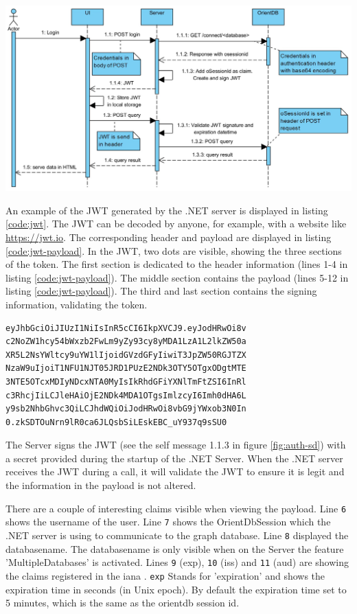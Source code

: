 \begingroup
\captionsetup{type=figure}
\includegraphics[scale=0.4]{images/authentication-sd.png}
\label{fig:auth-sd}
\endgroup

An example of the JWT generated by the .NET server is displayed in listing \ref{code:jwt}. The JWT can be decoded by anyone, for example, with a website like \url{https://jwt.io}. The corresponding header and payload are displayed in listing \ref{code:jwt-payload}. In the JWT, two dots are visible, showing the three sections of the token. The first section is dedicated to the header information (lines 1-4 in listing \ref{code:jwt-payload}). The middle section contains the payload (lines 5-12 in listing \ref{code:jwt-payload}). The third and last section contains the signing information, validating the token. 

\begin{lstlisting}[language=xml, caption=Example JSON Web Token (line breaks for display purposes only), style=nonrstyle, label=code:jwt]
eyJhbGciOiJIUzI1NiIsInR5cCI6IkpXVCJ9.eyJodHRwOi8v
c2NoZW1hcy54bWxzb2FwLm9yZy93cy8yMDA1LzA1L2lkZW50a
XR5L2NsYWltcy9uYW1lIjoidGVzdGFyIiwiT3JpZW50RGJTZX
NzaW9uIjoiT1NFU1NJT05JRD1PUzE2NDk3OTY5OTgxODgtMTE
3NTE5OTcxMDIyNDcxNTA0MyIsIkRhdGFiYXNlTmFtZSI6InRl
c3RhcjIiLCJleHAiOjE2NDk4MDA1OTgsImlzcyI6Imh0dHA6L
y9sb2NhbGhvc3QiLCJhdWQiOiJodHRwOi8vbG9jYWxob3N0In
0.zkSDTOuNrn9lR0ca6JLQsbSiLEskEBC_uY937q9sSU0
\end{lstlisting}

The Server signs the JWT (see the self message 1.1.3 in figure \ref{fig:auth-sd}) with a secret provided during the startup of the .NET Server. When the .NET server receives the JWT during a call, it will validate the JWT to ensure it is legit and the information in the payload is not altered.  

There are a couple of interesting claims visible when viewing the payload. Line \verb|6| shows the username of the user. Line \verb|7| shows the OrientDbSession which the .NET server is using to communicate to the graph database. Line \verb|8| displayed the databasename. The databasename is only visible when on the Server the feature 'MultipleDatabases' is activated. Lines \verb|9| (exp), \verb|10| (iss) and \verb|11| (aud) are showing the claims registered in the \acrfull{iana} \cite{jones2015json}. \verb|exp| Stands for 'expiration' and shows the expiration time in seconds (in Unix epoch). By default the expiration time set to 5 minutes, which is the same as the orientdb session id. 


